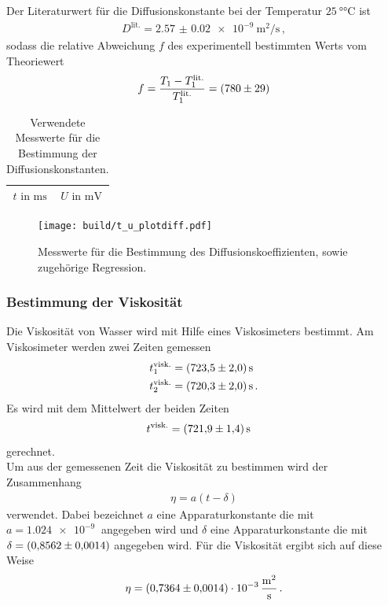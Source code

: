 Der Literaturwert \cite{wang1965self} für die Diffusionskonstante bei der Temperatur
$\SI{25}{\degree\celsius}$ ist
\begin{align*}
  D^\text{lit.} = \SI{2.57(2) e-9}{\meter\squared\per\second} \, ,
\end{align*}
sodass die relative Abweichung $f$ des experimentell bestimmten Werts
vom Theoriewert
\begin{align*}
  f = \frac{T_{1} - T_{1}^\text{lit.}}{T_{1}^\text{lit.}} = \SI{780+-29}{}
\end{align*}


\begin{table}
  \centering
  \caption{Verwendete Messwerte für die Bestimmung der Diffusionskonstanten.}
  \label{tab:diffusion}
  \begin{tabular}{c c}
  \toprule
  $t \text{ in } \si{\milli\second}$ & $U \text{ in } \si{\milli\volt}$\\
  \midrule
  
  \bottomrule
  \end{tabular}
\end{table}


\begin{figure}[hhh]
  \centering
  \texttt{[image: build/t\_u\_plotdiff.pdf]}
  \caption{Messwerte für die Bestimmung des Diffusionskoeffizienten, sowie zugehörige Regression.}
  \label{fig:diffusion}
\end{figure}

\FloatBarrier
\subsubsection{Bestimmung der Viskosität}
\label{subsubsec:viskositaet}
Die Viskosität von Wasser wird mit Hilfe eines Viskosimeters bestimmt.
Am Viskosimeter werden zwei Zeiten gemessen
\begin{align*}
  t_{1}^\text{visk.} &= \SI{723.5+-2}{\second}\\
  t_{2}^\text{visk.} &= \SI{720.3+-2}{\second}\, .
\end{align*}
Es wird mit dem Mittelwert der beiden Zeiten
\begin{align*}
  t^\text{visk.} &= \SI{721.9+-1.4}{\second}
\end{align*}
gerechnet.\\
Um aus der gemessenen Zeit die Viskosität zu bestimmen wird der Zusammenhang
\begin{align}
  \eta = a \left(t - \delta \right)
\end{align}
verwendet. Dabei bezeichnet $a$ eine Apparaturkonstante die mit $a = \SI{1.024e-9}{}$ angegeben wird und $\delta$
eine Apparaturkonstante die mit $\delta = \SI{0.8562+-0.0014}{}$ angegeben wird.
Für die Viskosität ergibt sich auf diese Weise
\begin{align*}
  \eta = \SI{0.7364+-0.0014 e-3}{\meter\squared\per\second} \, .
\end{align*}

